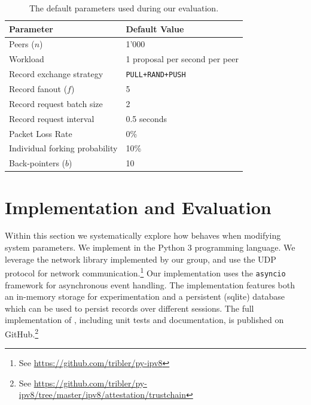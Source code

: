 \begin{table}[]
	\begin{center}
		\begin{tabular}{l l}
			\hline
			\textbf{Parameter} & \textbf{Default Value}  \\ \hline
			Peers ($ n $) & 1'000 \\
			Workload & 1 proposal per second per peer \\
			Record exchange strategy & \texttt{PULL+RAND+PUSH} \\
			Record fanout ($ f $) & 5 \\
			Record request batch size & 2 \\
			Record request interval & 0.5 seconds \\
			Packet Loss Rate & 0\% \\
			Individual forking probability & 10\% \\
			Back-pointers ($ b $) & 10 \\ \hline
		\end{tabular}
		\caption{The default parameters used during our evaluation.}
		\label{tab:experiment_parameters}
	\end{center}
\end{table}


\section{Implementation and Evaluation}
\label{sec:implementation_evaluation}
Within this section we systematically explore how \ModelName{} behaves when modifying system parameters.
We implement \ModelName{} in the Python 3 programming language.
We leverage the network library implemented by our group, and use the UDP protocol for network communication.\footnote{See \url{https://github.com/tribler/py-ipv8}}
Our implementation uses the \texttt{asyncio} framework for asynchronous event handling.
The implementation features both an in-memory storage for experimentation and a persistent (sqlite) database which can be used to persist records over different sessions.
The full implementation of \ModelName{}, including unit tests and documentation, is published on GitHub.\footnote{See \url{https://github.com/tribler/py-ipv8/tree/master/ipv8/attestation/trustchain}}

